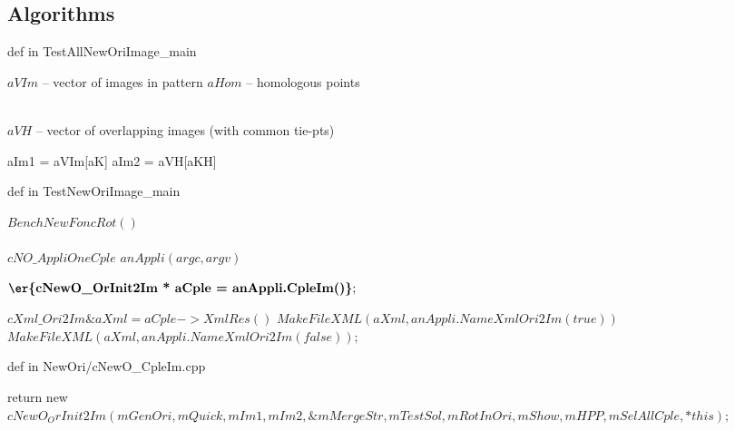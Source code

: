  
\subsection{Algorithms}
\begin{algorithm}
\caption{ def in TestAllNewOriImage\_main }
\begin{algorithmic}
\State  $aVIm$ -- vector of images in pattern
\State  $aHom$ -- homologous points\\
\\
\Comment {}

 
\State $aVH$ -- vector of overlapping images (with common tie-pts)

\State aIm1 = aVIm[aK]
\State aIm2 = aVH[aKH] 

\State {}
 
\EndFor   
\EndFor  
\end{algorithmic}\label{alg:AllOri2Im}
\end{algorithm}
% 
\begin{algorithm}
\caption{ def in TestNewOriImage\_main }
\begin{algorithmic}

\State  $BenchNewFoncRot()$ 
\\
\\
\Comment {}
\State $cNO\_AppliOneCple$ $anAppli(argc,argv)$

\Comment {}
\State $\textbf{\er{cNewO\_OrInit2Im * aCple = anAppli.CpleIm()}};$

\Comment {}
\State $cXml\_Ori2Im \&  aXml = {aCple->XmlRes()}$
\State $MakeFileXML(aXml,anAppli.NameXmlOri2Im(true))$
\State $MakeFileXML(aXml,anAppli.NameXmlOri2Im(false));$

\end{algorithmic}\label{alg:Ori2Im}
\end{algorithm}
%
\begin{algorithm}
\caption{ def in NewOri/cNewO\_CpleIm.cpp }
\begin{algorithmic}
\State 
\Comment {}

\State  return new $cNewO_OrInit2Im(mGenOri,mQuick,mIm1,mIm2,\&mMergeStr,mTestSol,mRotInOri,mShow,mHPP,mSelAllCple,*this);  $
 
\end{algorithmic}\label{alg:Ori2ImCont}
\end{algorithm}
%

